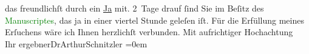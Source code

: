                     das freundlichſt durch ein \uline{Ja} mit. 2 Tage drauf
                    ſind Sie im Beſitz des \textcolor{green}{Manuscriptes}{}, das ja in einer viertel Stunde geleſen iſt.\pend
           \pstart
           Für die Erfüllung meines Erſuchens wäre ich Ihnen herzlichſt verbunden.\pend
           \pstart
           Mit aufrichtiger Hochachtung{\\[\baselineskip]}Ihr ergebner\spacefill\mbox{DrArthurSchnitzler}\pend
           \leftskip=0em{}\endnumbering{}  
      